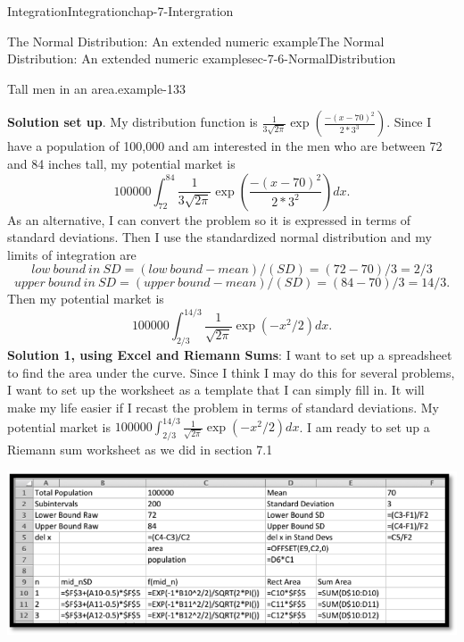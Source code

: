 \documentclass[oneside,10pt,]{book}
\newcommand{\terminology}[1]{\textbf{#1}}
\numberwithin{equation}{section}
\begin{document}
\begin{chapterptx}{Integration}{}{Integration}{}{}{chap-7-Intergration}
\begin{sectionptx}{The Normal Distribution: An extended numeric example}{}{The Normal Distribution: An extended numeric example}{}{}{sec-7-6-NormalDistribution}
\begin{example}{Tall men in an area.}{example-133}
\par
\hypertarget{p-2940}{}%
\terminology{Solution set up}.  My distribution function is \(\frac{1}{3\sqrt{2\pi}}\exp\left(\frac{-(x-70)^2}{2*3^3}\right)\). Since I have a population of 100,000 and am interested in the men who are between 72 and 84 inches tall, my potential market is%
%
\begin{equation*}
100000\int_{72}^{84} \frac{1}{3\sqrt{2\pi}} \exp\left(\frac{-(x-70)^2}{2*3^2} \right)dx.
\end{equation*}
\hypertarget{p-2941}{}%
As an alternative, I can convert the problem so it is expressed in terms of standard deviations.  Then I use the standardized normal distribution and my limits of integration are%
%
\begin{equation*}
low\ bound\ in\ SD = (low\ bound-mean)/(SD) = (72-70)/3 = 2/3
\end{equation*}
%
\begin{equation*}
upper\ bound\ in\ SD = (upper\ bound-mean)/(SD) = (84-70)/3 = 14/3.
\end{equation*}
\hypertarget{p-2942}{}%
Then my potential market is%
%
\begin{equation*}
100000\int_{2/3}^{14/3} \frac{1}{\sqrt{2\pi}} \exp(-x^2/2)dx.
\end{equation*}
\hypertarget{p-2943}{}%
\terminology{Solution 1, using Excel and Riemann Sums}:  I want to set up a spreadsheet to find the area under the curve.  Since I think I may do this for several problems, I want to set up the worksheet as a template that I can simply fill in.  It will make my life easier if I recast the problem in terms of standard deviations.   My potential market is \(100000\int_{2/3}^{14/3} \frac{1}{\sqrt{2\pi}} \exp(-x^2/2)dx\).   I am ready to set up a Riemann sum worksheet as we did in section 7.1%
\begin{sidebyside}{1}{0.1}{0.1}{0}%
\begin{sbspanel}{0.8}%
\includegraphics[width=1\linewidth]{images/sec7-6-2.png}
\end{sbspanel}%
\end{sidebyside}%

\end{example}
\end{sectionptx}
\end{chapterptx}
\end{document}
